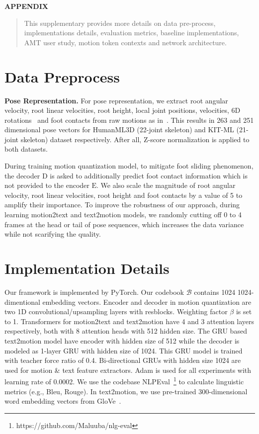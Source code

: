 \documentclass[runningheads]{llncs}
\newcommand{\beforesection}{\vspace{-2mm}}
\newcommand{\aftersection}{\vspace{-2mm}}
\newcommand{\beforesubsection}{\vspace{-2mm}}
\newcommand{\aftersubsection}{\vspace{-2mm}}
\begin{document}



\clearpage


\appendix
\noindent\textbf{\large APPENDIX}
\begin{abstract}
This supplementary provides more details on data pre-process, implementations details, evaluation metrics, baseline implementations, AMT user study, motion token contexts and network architecture.
\end{abstract}
\beforesection
\section{Data Preprocess}
\aftersection
\noindent\textbf{Pose Representation.} For pose representation, we extract root angular velocity, root linear velocities, root height, local joint positions, velocities, 6D rotations~\cite{zhou2019continuity} and foot contacts from raw motions as in~\cite{holden2017phase}. This results in 263 and 251 dimensional pose vectors for HumanML3D (22-joint skeleton) and KIT-ML (21-joint skeleton) dataset respectively. After all, Z-score normalization is applied to both datasets.

During training motion quantization model, to mitigate foot sliding phenomenon, the decoder $\mathrm{D}$ is asked to additionally predict foot contact information which is not provided to the encoder $\mathrm{E}$. We also scale the magnitude of root angular velocity, root linear velocities, root height and foot contacts by a value of 5 to amplify their importance. To improve the robustness of our approach, during learning motion2text and text2motion models, we randomly cutting off 0 to 4 frames at the head or tail of pose sequences, which increases the data variance while not scarifying the quality.

\beforesubsection
\section{Implementation Details}
\aftersubsection
Our framework is implemented by PyTorch. Our codebook $\mathscr{B}$ contains 1024 1024-dimentional embedding vectors. 
Encoder and decoder in motion quantization are two 1D convolutional/upsampling layers with resblocks. Weighting factor $\beta$ is set to 1. Transformers for motion2text and text2motion have 4 and 3 attention layers respectively, both with 8 attention heads with 512 hidden size. The GRU based text2motion model have encoder with hidden size of 512 while the decoder is modeled as 1-layer GRU with hidden size of 1024. This GRU model is trained with teacher force ratio of 0.4. Bi-directional GRUs with hidden size 1024 are used for motion \& text feature extractors. Adam is used for all experiments with learning rate of 0.0002. We use the codebase NLPEval~\footnote{https://github.com/Maluuba/nlg-eval} to calculate linguistic metrics (e.g., Bleu, Rouge). In text2motion, we use pre-trained 300-dimensional word embedding vectors from GloVe~\cite{pennington2014glove}. 
\end{document}
